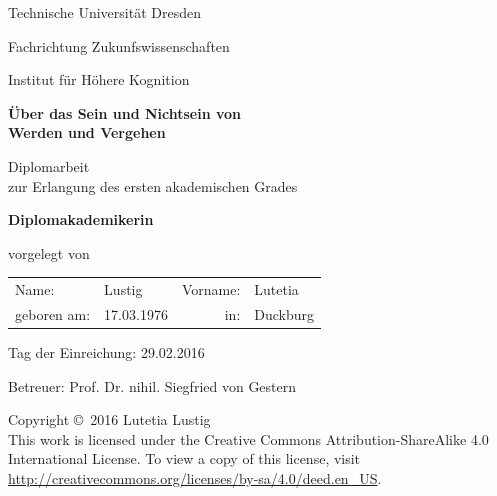 \documentclass{scrbook}
\begin{document}
\frontmatter

\begin{titlepage}

  \begin{center}
    \Huge

    Technische Universität Dresden

    Fachrichtung Zukunfswissenschaften

    \bigskip

    \LARGE

    Institut für Höhere Kognition

    \vfill

    \huge

    \textbf{Über das Sein und Nichtsein von\\ Werden und Vergehen}

    \LARGE

    \vfill

    Diplomarbeit \\
    zur Erlangung des ersten akademischen Grades

    \bigskip

    \textbf{Diplomakademikerin}

  \end{center}

  \vfill

  \Large

  vorgelegt von

  \vspace*{2\bigskipamount}

  \begin{tabular}{@{}lp{4cm}@{\qquad}rl@{}}
    Name:       & Lustig     & Vorname: & Lutetia\\[2.0ex]
    geboren am: & 17.03.1976 & in:      & Duckburg
  \end{tabular}

  \vspace*{4\bigskipamount}

  Tag der Einreichung: 29.02.2016

  \vspace*{2\bigskipamount}

  Betreuer: Prof. Dr. nihil. Siegfried von Gestern

\end{titlepage}

\newpage

\hbox{}\vfill

\noindent
Copyright \copyright\  2016 Lutetia Lustig\\
This work is licensed under the Creative Commons Attribution-ShareAlike 4.0
International License. To view a copy of this license, visit
\url{http://creativecommons.org/licenses/by-sa/4.0/deed.en_US}.
\end{document}
